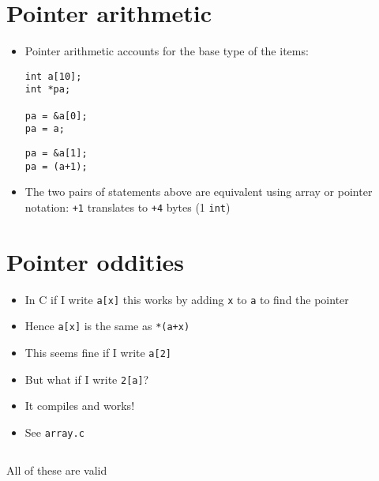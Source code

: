 \documentclass{article}
\begin{document}
\section{Pointer arithmetic}
\begin{itemize}
\item Pointer arithmetic accounts for the base type of the items: 

\begin{verbatim}
int a[10];
int *pa;

pa = &a[0];
pa = a;
\end{verbatim}

\begin{center}
\end{center}

\begin{verbatim}
pa = &a[1];
pa = (a+1);
\end{verbatim}

\begin{center}
\end{center}

\item The two pairs of statements above are equivalent using array or pointer notation: \verb!+1! translates to \verb!+4! bytes (1 \verb!int!)
\end{itemize}



\section{Pointer oddities}
\begin{itemize}
\item In C if I write \verb!a[x]! this works by adding \verb!x! to \verb!a! to find the pointer
\item Hence \verb!a[x]! is the same as \verb!*(a+x)!
\item This seems fine if I write \verb!a[2]!
\item But what if I write \verb!2[a]!?
\item It compiles and works!
\item See \verb!array.c!
\end{itemize}
\inputminted{c}{array.c}
All of these are valid
\end{document}
